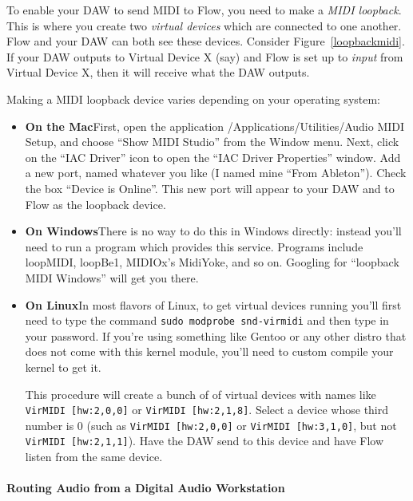 \documentclass{article}
\newcommand\name{Flow}
\begin{document}
To enable your DAW to send MIDI to Flow, you need to make a {\it MIDI loopback}.  This is where you create two {\it virtual devices} which are connected to one another.  {\name} and your DAW can both see these devices.  Consider Figure~\ref{loopbackmidi}.  If your DAW outputs to Virtual Device X (say) and {\name} is set up to {\it input} from Virtual Device X, then it will receive what the DAW outputs.

Making a MIDI loopback device varies depending on your operating system:

\begin{itemize}
\item {\bf On the Mac}\quad First, open the application \textsf{/Applications/Utilities/Audio MIDI Setup}, and choose ``Show MIDI Studio'' from the Window menu.  Next, click on the ``IAC Driver'' icon to open the ``IAC Driver Properties'' window.  Add a new port, named whatever you like (I named mine ``From Ableton'').  Check the box ``Device is Online''.  This new port will appear to your DAW and to {\name} as the loopback device.

\item {\bf On Windows}\quad There is no way to do this in Windows directly: instead you'll need to run a program which provides this service.  Programs include {\sf loopMIDI},  {\sf loopBe1}, MIDIOx's {\sf MidiYoke}, and so on.  Googling for ``loopback MIDI Windows'' will get you there. 

\item {\bf On Linux}\quad In most flavors of Linux, to get virtual devices running you'll first need to type the command \hbox{\tt sudo modprobe snd-virmidi} and then type in your password.  \quad If you're using something like Gentoo or any other distro that does not come with this kernel module, you'll need to custom compile your kernel to get it. 

This procedure will create a bunch of of virtual devices with names like {\tt VirMIDI [hw:2,0,0]} or {\tt VirMIDI [hw:2,1,8]}.  Select a device whose third number is 0 (such as {\tt VirMIDI [hw:2,0,0]} or {\tt VirMIDI [hw:3,1,0]}, but not {\tt VirMIDI [hw:2,1,1]}).  Have the DAW send to this device and have {\name} listen from the same device.
\end{itemize}

\paragraph{Routing Audio from a Digital Audio Workstation}
\end{document}
